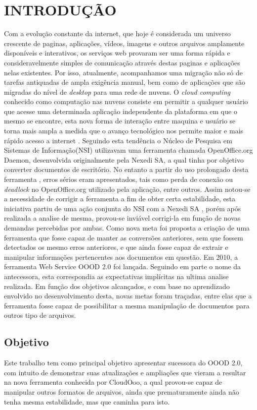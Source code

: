 \chapter{INTRODUÇÃO}

Com a evolução constante da internet, que hoje é considerada um universo crescente de paginas, aplicações, vídeos, imagens e outros arquivos amplamente disponíveis e interativos, os serviços web provaram ser uma forma rápida e consideravelmente simples de comunicação através destas paginas e aplicações nelas existentes.
Por isso, atualmente, acompanhamos uma migração não só de tarefas antiquadas de ampla exigência manual, bem como de aplicações que são migradas do nível de \textit{desktop} para uma rede de nuvens.
O \textit{cloud computing} conhecido como computação nas nuvens consiste em permitir a  qualquer usuário que acesse uma determinada aplicação independente da plataforma em que o mesmo se encontre, esta nova forma de interação entre maquina e usuário se torna mais ampla a medida que o avanço tecnológico nos permite maior e mais rápido acesso a internet \cite{Alecrim 2008}.
Seguindo esta tendência o Núcleo de Pesquisa em Sistemas de Informação(NSI) utilizavam uma ferramenta chamada OpenOffice.org Daemon, desenvolvida originalmente pela Nexedi SA, a qual tinha por objetivo converter documentos de escritório. No entanto a partir do uso prolongado desta ferramenta , erros  sérios  eram apresentados, tais como perda de conexão ou \textit{deadlock} no OpenOffice.org utilizado pela aplicação, entre outros. Assim notou-se a necessidade de corrigir a ferramenta a fim de obter certa estabilidade, esta iniciativa partiu de uma ação conjunta do NSI com a Nexedi SA , porém após realizada a analise de mesma, provou-se inviável corrigi-la em função de novas demandas percebidas por ambas. 
Como nova meta foi proposta a criação de uma ferramenta que fosse capaz de manter as conversões  anteriores, sem que fossem detectados os mesmo erros anteriores, e que ainda fosse capaz de extrair e manipular informações pertencentes aos documentos em questão. 
Em 2010, a ferramenta Web Service OOOD 2.0 foi lançada. Seguindo em parte o nome da antecessora, esta correspondia as expectativas implícitas na ultima analise realizada. Em função dos objetivos alcançados, e com base no aprendizado envolvido no desenvolvimento desta, novas metas foram traçadas, entre elas que a ferramenta fosse capaz de possibilitar a mesma manipulação de documentos para outros tipo de arquivos.

\section{Objetivo}
Este trabalho tem como principal objetivo apresentar sucessora do OOOD 2.0, com intuito de demonstrar suas atualizações e ampliações que vieram a resultar na nova ferramenta conhecida por CloudOoo, a qual provou-se capaz de manipular outros formatos de arquivos, ainda que prematuramente ainda não tenha mesma estabilidade, mas que caminha para isto.

